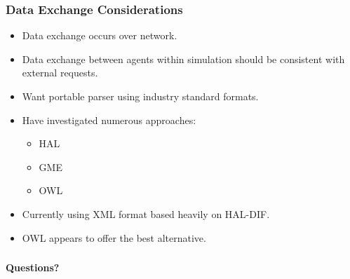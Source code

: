 \documentclass{beamer}
\begin{document}
\begin{frame}
  \frametitle{Data Exchange Considerations}

  \begin{itemize}
  \item Data exchange occurs over network.
  \item Data exchange between agents within simulation should be
    consistent with external requests.
  \item Want portable parser using industry standard formats.
  \item Have investigated numerous approaches:
    \begin{itemize}
    \item HAL
    \item GME
    \item OWL
    \end{itemize}
  \item Currently using XML format based heavily on HAL-DIF.
  \item OWL appears to offer the best alternative.
  \end{itemize}
  

\end{frame}




%
%
%
%



%    
%  
%
%
%





\begin{frame}
  \frametitle{}

  \centerline{\textbf{\Large Questions?}}
  
\end{frame}
\end{document}
